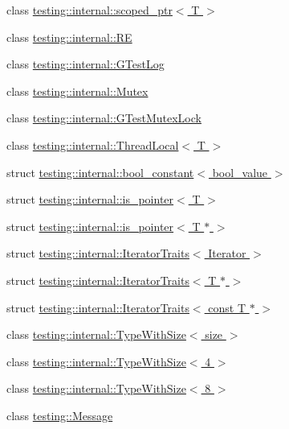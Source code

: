 \begin{DoxyCompactItemize}
\item 
class \hyperlink{classtesting_1_1internal_1_1scoped__ptr}{testing\-::internal\-::scoped\-\_\-ptr$<$ T $>$}
\item 
class \hyperlink{classtesting_1_1internal_1_1_r_e}{testing\-::internal\-::\-R\-E}
\item 
class \hyperlink{classtesting_1_1internal_1_1_g_test_log}{testing\-::internal\-::\-G\-Test\-Log}
\item 
class \hyperlink{classtesting_1_1internal_1_1_mutex}{testing\-::internal\-::\-Mutex}
\item 
class \hyperlink{classtesting_1_1internal_1_1_g_test_mutex_lock}{testing\-::internal\-::\-G\-Test\-Mutex\-Lock}
\item 
class \hyperlink{classtesting_1_1internal_1_1_thread_local}{testing\-::internal\-::\-Thread\-Local$<$ T $>$}
\item 
struct \hyperlink{structtesting_1_1internal_1_1bool__constant}{testing\-::internal\-::bool\-\_\-constant$<$ bool\-\_\-value $>$}
\item 
struct \hyperlink{structtesting_1_1internal_1_1is__pointer}{testing\-::internal\-::is\-\_\-pointer$<$ T $>$}
\item 
struct \hyperlink{structtesting_1_1internal_1_1is__pointer_3_01_t_01_5_01_4}{testing\-::internal\-::is\-\_\-pointer$<$ T $\ast$ $>$}
\item 
struct \hyperlink{structtesting_1_1internal_1_1_iterator_traits}{testing\-::internal\-::\-Iterator\-Traits$<$ Iterator $>$}
\item 
struct \hyperlink{structtesting_1_1internal_1_1_iterator_traits_3_01_t_01_5_01_4}{testing\-::internal\-::\-Iterator\-Traits$<$ T $\ast$ $>$}
\item 
struct \hyperlink{structtesting_1_1internal_1_1_iterator_traits_3_01const_01_t_01_5_01_4}{testing\-::internal\-::\-Iterator\-Traits$<$ const T $\ast$ $>$}
\item 
class \hyperlink{classtesting_1_1internal_1_1_type_with_size}{testing\-::internal\-::\-Type\-With\-Size$<$ size $>$}
\item 
class \hyperlink{classtesting_1_1internal_1_1_type_with_size_3_014_01_4}{testing\-::internal\-::\-Type\-With\-Size$<$ 4 $>$}
\item 
class \hyperlink{classtesting_1_1internal_1_1_type_with_size_3_018_01_4}{testing\-::internal\-::\-Type\-With\-Size$<$ 8 $>$}
\item 
class \hyperlink{classtesting_1_1_message}{testing\-::\-Message}
\item 

\end{DoxyCompactItemize}
